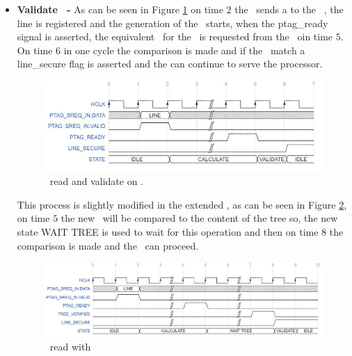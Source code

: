 \begin{itemize}
 \item{\textbf{Validate \ptag~- }} As can be seen in Figure \ref{fig:ptgag_rd_no_mt}  on time $2$ the \handler~sends a  \sline to the \seceng~, the line is registered and the generation of the \ptag~starts, when the ptag\_ready signal is asserted,  the equivalent \ptag~for the \sline~is requested from the \ptagmem~oin time $5$. On time $6$ in one cycle the comparison is made and if the \ptags~match a line\_secure flag is asserted and the \handler can continue to serve the processor.
 
   \begin{figure}[!ht]
    \centering
    \includegraphics[width=\textwidth]{figures/others/ptag_read_sec_eng.JPG}
    \caption{\ptag~read and validate on \seceng.}
    \label{fig:ptgag_rd_no_mt}
\end{figure}
This process is slightly modified  in the extended \cshia, as can be seen in Figure  \ref{fig:ptgag_rd_mt}, on time $5$  the new \ptag~will be compared to the content of the tree so, the new state WAIT TREE  is used to wait for this  operation and then  on time $8$ the comparison is made and the \seceng~can proceed.   
\begin{figure}[!ht]
    \centering
    \includegraphics[width=\textwidth]{figures/others/ptag_read_tree_sec_eng.JPG}
    \caption{\ptag~read with \mt }
    \label{fig:ptgag_rd_mt}
\end{figure}


\end{itemize}
